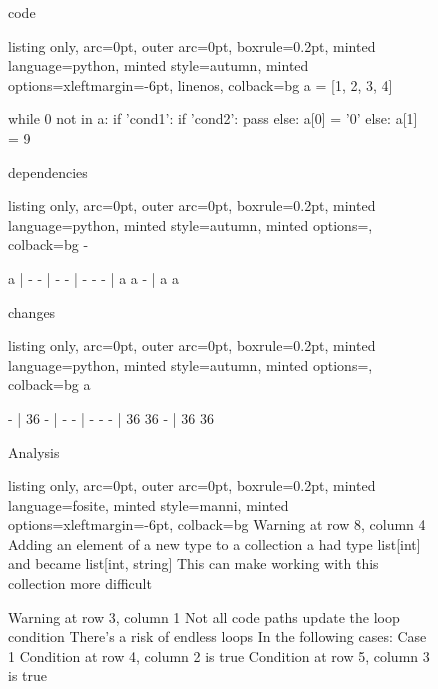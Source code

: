 \begin{figure}[!h]
 \begin{minipage}{0.32\textwidth}
 code
 \vspace{2pt}
  \begin{tcblisting}{listing only, 
    arc=0pt,
    outer arc=0pt, 
    boxrule=0.2pt,
    minted language=python,
    minted style=autumn,
    minted options={xleftmargin=-6pt, linenos},
    colback=bg }
a = [1, 2, 3, 4]

while 0 not in a:
  if 'cond1':
    if 'cond2':
      pass
    else:
      a[0] = '0'
  else:
    a[1] = 9
\end{tcblisting}
 \end{minipage}
 \begin{minipage}{0.32\textwidth}
 dependencies
  \begin{tcblisting}{listing only, 
    arc=0pt,
    outer arc=0pt, 
    boxrule=0.2pt,
    minted language=python,
    minted style=autumn,
    minted options={},
    colback=bg }
- 

a | -
    - | -
        - | -
            -
        - | a
            a
    - | a
        a
\end{tcblisting}
 \end{minipage}
 \begin{minipage}{0.32\textwidth}
 changes
  \begin{tcblisting}{listing only, 
    arc=0pt,
    outer arc=0pt, 
    boxrule=0.2pt,
    minted language=python,
    minted style=autumn,
    minted options={},
    colback=bg }
a

- | 36
    - | -
        - | -
            -
        - | 36
            36
    - | 36
        36
\end{tcblisting}
 \end{minipage}
 \begin{minipage}{\textwidth}
  \vspace{4pt}
  Analysis
  \begin{tcblisting}{listing only, 
    arc=0pt,
    outer arc=0pt, 
    boxrule=0.2pt,
    minted language=fosite,
    minted style=manni,
    minted options={xleftmargin=-6pt},
    colback=bg }
Warning at row 8, column 4
  Adding an element of a new type to a collection
  a had type list[int] and became list[int, string]
  This can make working with this collection more difficult 

Warning at row 3, column 1
  Not all code paths update the loop condition
  There's a risk of endless loops
  In the following cases:
  Case 1
    Condition at row 4, column 2 is true
    Condition at row 5, column 3 is true
\end{tcblisting}
 \end{minipage}
 \label{lst:endless2}
\end{figure}